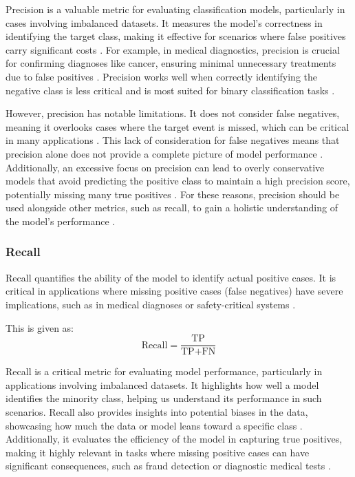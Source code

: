 Precision is a valuable metric for evaluating classification models, particularly in cases involving imbalanced datasets. It measures the model's correctness in identifying the target class, making it effective for scenarios where false positives carry significant costs \cite{evidentlyai_accuracy_precision_recall}. For example, in medical diagnostics, precision is crucial for confirming diagnoses like cancer, ensuring minimal unnecessary treatments due to false positives \cite{appliedai_evaluation_metrics}. Precision works well when correctly identifying the negative class is less critical and is most suited for binary classification tasks \cite{bose_classification_metrics}.

However, precision has notable limitations. It does not consider false negatives, meaning it overlooks cases where the target event is missed, which can be critical in many applications \cite{evidentlyai_accuracy_precision_recall,pareto_precision_recall}. This lack of consideration for false negatives means that precision alone does not provide a complete picture of model performance . Additionally, an excessive focus on precision can lead to overly conservative models that avoid predicting the positive class to maintain a high precision score, potentially missing many true positives
. For these reasons, precision should be used alongside other metrics, such as recall, to gain a holistic understanding of the model’s performance \cite{pareto_precision_recall}.

\subsubsection{Recall}
Recall quantifies the ability of the model to identify actual positive cases. It is critical in applications where missing positive cases (false negatives) have severe implications, such as in medical diagnoses or safety-critical systems \cite{article}.

This is given as: 
\begin{equation}
    \text{Recall} = \frac{\text{TP}}{\text{TP} + \text{FN}}
\end{equation}

Recall is a critical metric for evaluating model performance, particularly in applications involving imbalanced datasets. It highlights how well a model identifies the minority class, helping us understand its performance in such scenarios. Recall also provides insights into potential biases in the data, showcasing how much the data or model leans toward a specific class \cite{bose_classification_metrics}. Additionally, it evaluates the efficiency of the model in capturing true positives, making it highly relevant in tasks where missing positive cases can have significant consequences, such as fraud detection or diagnostic medical tests \cite{appliedai_evaluation_metrics,evidentlyai_accuracy_precision_recall}.

